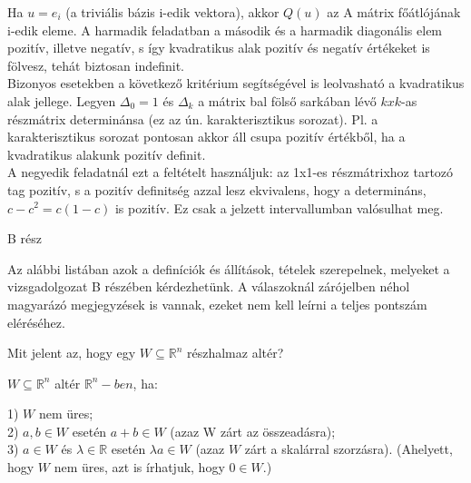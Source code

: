 \begin{frame}
\begin{tcolorbox}[title={Megoldások {\symking}}]
			Ha $u = e_i$ (a triviális bázis i-edik vektora), akkor $Q(u)$ az A mátrix főátlójának i-edik eleme. A harmadik feladatban a második és a harmadik diagonális elem pozitív, illetve negatív, s így kvadratikus alak pozitív és negatív értékeket is fölvesz, tehát biztosan indefinit.\\
			Bizonyos esetekben a következő kritérium segítségével is leolvasható a kvadratikus alak jellege. Legyen ${\Delta}_0 = 1$ és ${\Delta}_k$ a mátrix bal fölső sarkában lévő $k xk$-as részmátrix determinánsa (ez az ún. karakterisztikus sorozat). Pl. a karakterisztikus sorozat pontosan akkor áll csupa pozitív értékből, ha a kvadratikus alakunk pozitív definit.\\
			A negyedik feladatnál ezt a feltételt használjuk: az 1x1-es részmátrixhoz tartozó tag pozitív, s a pozitív definitség azzal lesz ekvivalens, hogy a determináns, $c-c^2 = c(1-c)$ is pozitív. Ez csak a jelzett intervallumban valósulhat meg.
  \end{tcolorbox}
\end{frame}


\begin{frame}[plain]
\begin{tcolorbox}[center, colback={myyellow}, coltext={black}, colframe={myyellow}]
    {\RHuge  B rész}
    \mmedskip
\end{tcolorbox}
\end{frame}


\begin{frame}
  \begin{tcolorbox}
     Az alábbi listában azok a definíciók és állítások, tételek szerepelnek, melyeket a vizsgadolgozat B részében kérdezhetünk. A válaszoknál zárójelben néhol magyarázó megjegyzések is vannak, ezeket nem kell leírni a teljes pontszám eléréséhez.
  \end{tcolorbox}
\end{frame}

\begin{frame}
  \begin{tcolorbox}[title={1}]
      Mit jelent az, hogy egy $W {\subseteq} \mathbb{R}^n$ részhalmaz altér?

  \tcblower
$W {\subseteq} \mathbb{R}^n$ altér $\mathbb{R}^n-ben$, ha:\\
\mmedskip

1) $W$ nem üres;\\
2) $a,b \in W$ esetén $a + b \in W$ (azaz W zárt az összeadásra);\\
3) $a \in W$ és ${\lambda} \in \mathbb{R}$ esetén ${\lambda}a \in W$ (azaz $W$ zárt a skalárral szorzásra). (Ahelyett, hogy $W$ nem üres, azt is írhatjuk, hogy $0 \in W$.)
  \end{tcolorbox}
\end{frame}



